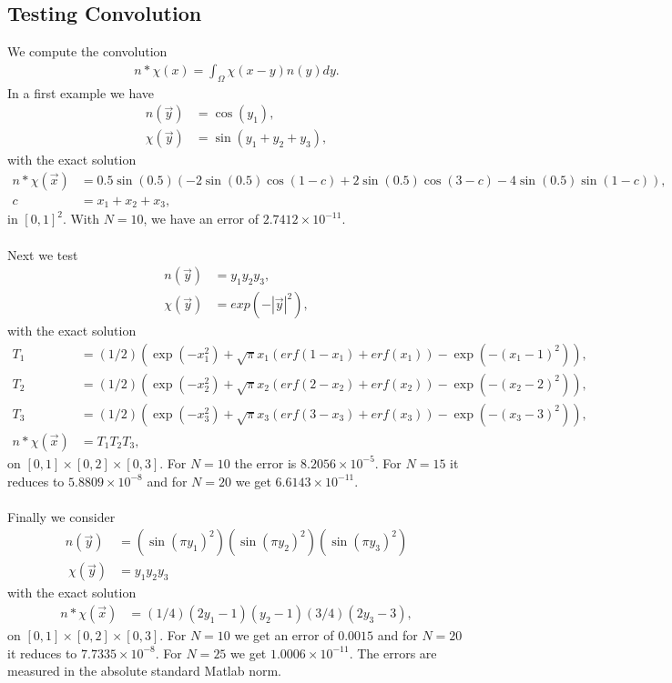 \documentclass[11pt, a4paper]{article}
\theoremstyle{definition}
\begin{document}
\subsection{Testing Convolution}
We compute the convolution
\begin{align*}
	n * \chi (x) = \int_\Omega \chi(x - y) n(y) dy.
\end{align*}
In a first example we have
\begin{align*}
	n(\vec y) &= \cos(y_1),\\
	\chi(\vec y) &= \sin(y_1 + y_2 + y_3),
\end{align*}
with the exact solution
\begin{align*}
	n * \chi (\vec x) &= 0.5 \sin(0.5) \left(-2\sin(0.5)\cos( 1 - c ) + 2 \sin(0.5)\cos(3 - c) - 4\sin(0.5)\sin(1 - c) \right),\\
	c &= x_1 + x_2 + x_3,
\end{align*}
in $[0,1]^2$. With $N = 10$, we have an error of $2.7412 \times 10^{-11}$.
\\
\\
Next we test 
\begin{align*}
	n(\vec y) &= y_1 y_2 y_3,\\
	\chi(\vec y) &= exp(-|\vec y|^2),
\end{align*}
with the exact solution
\begin{align*}
	T_1 &= (1/2)(\exp(-x_1^2) + \sqrt\pi x_1(erf(1 - x_1) + erf(x_1)) - \exp( - (x_1 - 1)^2)),\\
	T_2 &= (1/2)(\exp(-x_2^2) + \sqrt\pi x_2(erf(2 - x_2) + erf(x_2)) - \exp( - (x_2 - 2)^2)),\\
	T_3 &= (1/2)(\exp(-x_3^2) + \sqrt\pi x_3(erf(3 - x_3) + erf(x_3)) - \exp( - (x_3 - 3)^2)),\\
	n * \chi (\vec x) &= T_1 T_2 T_3,
\end{align*}
on $[0,1] \times [0,2] \times [0,3]$.
For $N = 10$ the error is $8.2056 \times 10^{-5}$. For $N = 15$ it reduces to $5.8809 \times 10^{-8}$ and for $N = 20$ we get $6.6143 \times 10^{-11}$.
\\
\\
Finally we consider
\begin{align*}
	n(\vec y) &=(\sin(\pi y_1)^2)(\sin(\pi y_2)^2)(\sin(\pi y_3)^2)\\\
	\chi(\vec y) &= y_1 y_2 y_3\
\end{align*}
with the exact solution
\begin{align*}
	n * \chi (\vec x) &= (1/4)(2y_1 - 1)(y_2 - 1)(3/4)(2y_3 - 3),
\end{align*}
on $[0,1] \times [0,2] \times [0,3]$.
For $N = 10$ we get an error of $0.0015$ and for $N = 20$ it reduces to $7.7335 \times 10^{-8}$. For $N = 25$ we get $1.0006 \times 10^{-11}$.
The errors are measured in the absolute standard Matlab norm.
\end{document}
